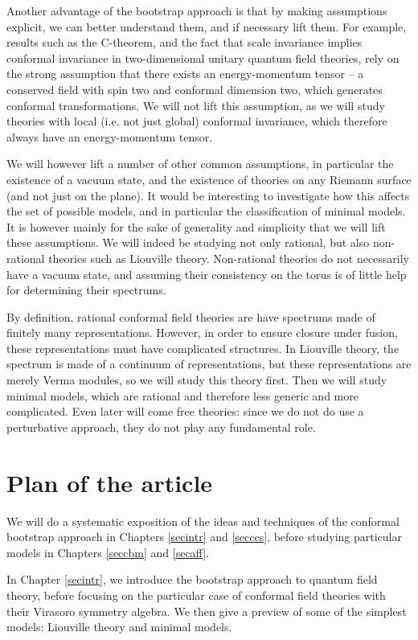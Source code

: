 \documentclass[12pt,a4paper,notitlepage]{report}
\numberwithin{equation}{section}
\theoremstyle{break}
\begin{document}
Another advantage of the bootstrap approach is that by making assumptions explicit, we can better understand them, and if necessary lift them. For example, results such as the C-theorem, and the fact that scale invariance implies conformal invariance in two-dimensional unitary quantum field theories, rely on the strong assumption that there exists an energy-momentum tensor -- a conserved field with spin two and conformal dimension two, which generates conformal transformations. We will not lift this assumption, as we will study theories with local (i.e. not just global) conformal invariance, which therefore always have an energy-momentum tensor.

We will however lift a number of other common assumptions, in particular the existence of a vacuum state, and the existence of theories on any Riemann surface (and not just on the plane). It would be interesting to investigate how this affects the set of possible models, and in particular the classification of minimal models. It is however mainly for the sake of generality and simplicity that
we will lift these assumptions. We will indeed be studying not only rational, but also non-rational theories such as Liouville theory. Non-rational theories do not necessarily have a vacuum state, and assuming their consistency on the torus is of little help for determining their spectrums. 

By definition, rational conformal field theories are have spectrums made of finitely many representations. However, in order to ensure closure under fusion, these representations must have complicated structures. In Liouville theory, the spectrum is made of a continuum of representations, but these representations are merely Verma modules, so we will study this theory first. Then we will study minimal models, which are rational and therefore less generic and more complicated. Even later will come free theories: since we do not do use a perturbative approach, they do not play any fundamental role. 


\section{Plan of the article \label{secplan}}

We will do a systematic exposition of the ideas and techniques of the conformal bootstrap approach in Chapters \ref{secintr} and \ref{secccs}, before studying particular models in Chapters \ref{seccbm} and \ref{secaff}.

In Chapter \ref{secintr}, we introduce the bootstrap approach to quantum field theory, before focusing on the particular case of conformal field theories with their Virasoro symmetry algebra. We then give a preview of some of the simplest models: Liouville theory and minimal models.
\end{document}
